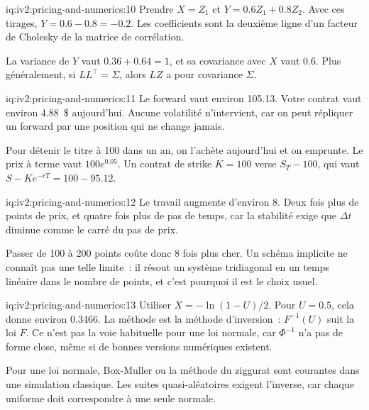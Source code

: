 \begin{solution}{iq:iv2:pricing-and-numerics:10}
Prendre $X = Z_1$ et $Y = 0.6Z_1 + 0.8Z_2$. Avec ces tirages, $Y = 0.6 - 0.8 = -0.2$. Les coefficients sont la deuxième ligne d'un facteur de Cholesky de la matrice de corrélation.

La variance de $Y$ vaut $0.36 + 0.64 = 1$, et sa covariance avec $X$ vaut 0.6. Plus généralement, si $LL^\top = \Sigma$, alors $LZ$ a pour covariance $\Sigma$.

\end{solution}

\begin{solution}{iq:iv2:pricing-and-numerics:11}
Le forward vaut environ 105.13. Votre contrat vaut environ 4.88~\$ aujourd'hui. Aucune volatilité n'intervient, car on peut répliquer un forward par une position qui ne change jamais.

Pour détenir le titre à 100 dans un an, on l'achète aujourd'hui et on emprunte. Le prix à terme vaut $100e^{0.05}$. Un contrat de strike $K = 100$ verse $S_T - 100$, qui vaut $S - Ke^{-rT} = 100 - 95.12$.

\end{solution}

\begin{solution}{iq:iv2:pricing-and-numerics:12}
Le travail augmente d'environ 8. Deux fois plus de points de prix, et quatre fois plus de pas de temps, car la stabilité exige que $\Delta t$ diminue comme le carré du pas de prix.

Passer de 100 à 200 points coûte donc 8 fois plus cher. Un schéma implicite ne connaît pas une telle limite~: il résout un système tridiagonal en un temps linéaire dans le nombre de points, et c'est pourquoi il est le choix usuel.

\end{solution}

\begin{solution}{iq:iv2:pricing-and-numerics:13}
Utiliser $X = -\ln(1 - U)/2$. Pour $U = 0.5$, cela donne environ 0.3466. La méthode est la méthode d'inversion~: $F^{-1}(U)$ suit la loi $F$. Ce n'est pas la voie habituelle pour une loi normale, car $\Phi^{-1}$ n'a pas de forme close, même si de bonnes versions numériques existent.

Pour une loi normale, Box-Muller ou la méthode du ziggurat sont courantes dans une simulation classique. Les suites quasi-aléatoires exigent l'inverse, car chaque uniforme doit correspondre à une seule normale.

\end{solution}

